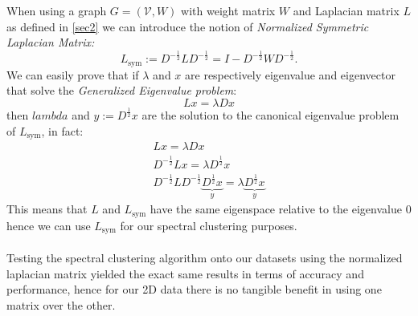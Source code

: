 When using a graph \(G = (\mathcal{V}, W)\) with weight matrix \(W\) and Laplacian matrix \(L\) as defined in \ref{sec2} we can introduce the notion of \textit{Normalized Symmetric Laplacian Matrix:}
\begin{equation} \label{eq_Lsym}
    L_{\text{sym}} := D^{-\frac{1}{2}} L D^{-\frac{1}{2}} = I - D^{-\frac{1}{2}} W D^{-\frac{1}{2}}.
\end{equation}
We can easily prove that if \(\lambda\) and \(x\) are respectively eigenvalue and eigenvector that solve the \textit{Generalized Eigenvalue problem}:
\begin{equation}
    Lx = \lambda D x
\end{equation} 
then \(lambda\) and \(y := D^{\frac{1}{2}}x\) are the solution to the canonical eigenvalue problem of \(L_{\text{sym}}\), in fact:
\begin{equation*}
    \begin{gathered}
        Lx = \lambda D x \\
    D^{-\frac{1}{2}}L x = \lambda D^{\frac{1}{2}} x \\
    D^{-\frac{1}{2}} L D^{-\frac{1}{2}} \underbrace{D^{\frac{1}{2}} x}_{y} = \lambda  \underbrace{D^{\frac{1}{2}} x}_{y}    
    \end{gathered}
\end{equation*}
This means that \(L\) and \(L_{\text{sym}}\) have the same eigenspace relative to the eigenvalue \(0\) hence we can use \(L_{\text{sym}}\) for our spectral clustering purposes.
\\
\\
Testing the spectral clustering algorithm onto our datasets using the normalized laplacian matrix yielded the exact same results in terms of accuracy and performance, hence for our 2D data there is no tangible benefit in using one matrix over the other.